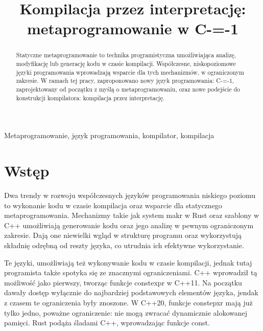 \documentclass[conference]{IEEEtran}
\begin{document}
\title{Kompilacja przez interpretację: metaprogramowanie w C-=-1
}

\author{
}

\maketitle

\begin{abstract}
    Statyczne metaprogramowanie to technika programistyczna umożliwiająca analizę, modyfikację lub generację kodu w czasie kompilacji.
    Współczesne, niskopoziomowe języki programowania wprowadzają wsparcie dla tych mechanizmów, w ograniczonym zakresie.
    W ramach tej pracy, zaproponowano nowy język programowania: C-=-1, zaprojektowany od początku z myślą o metaprogramowaniu, oraz nowe podejście do konstrukcji kompilatora: kompilacja przez interpretację.
\end{abstract}

\begin{IEEEkeywords}
    Metaprogramowanie, język programowania, kompilator, kompilacja
\end{IEEEkeywords}

\section{Wstęp}
Dwa trendy w rozwoju współczesnych języków programowania niskiego poziomu to wykonanie kodu w czasie kompilacja oraz wsparcie dla statycznego metaprogramowania.
Mechanizmy takie jak system makr w Rust oraz szablony w C++ umożliwiają generowanie kodu oraz jego analizę w pewnym ograniczonym zakresie.
Dają one niewielki wgląd w strukturę programu oraz wykorzystują składnię odrębną od reszty języka, co utrudnia ich efektywne wykorzystanie.

Te języki, umożliwiają też wykonywanie kodu w czasie kompilacji, jednak tutaj programista także spotyka się ze znacznymi ograniczeniami.
C++ wprowadził tą możliwość jako pierwszy, tworząc funkcje constexpr w C++11.
Na początku dawały dostęp wyłącznie do najbardziej podstawowych elementów języka, jendak z czasem te ograniczenia były znoszone.
W C++20, funkcje constepxr mają już tylko jedno, poważne ograniczenie: nie mogą zwracać dynamicznie alokowanej pamięci.
Rust podąża śladami C++, wprowadzając funkcje const.
\end{document}
